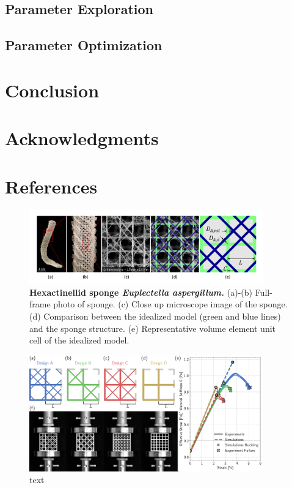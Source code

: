 \documentclass[9pt,twocolumn,twoside]{fernandes_paper}
\begin{document}
\subsection{Parameter Exploration}
\subsection{Parameter Optimization}

\section{Conclusion}

\section*{Acknowledgments}
\section*{References}

\begin{figure}[ht]
  \captionsetup{width=0.8\textwidth}
\begin{center}
\includegraphics[width=0.9\textwidth]{Fig1}
\end{center}
\caption{\textbf{Hexactinellid sponge \textit{Euplectella aspergillum.}} (a)-(b) Full-frame photo of sponge. (c) Close up microscope image of the sponge. (d) Comparison between the idealized model (green and blue lines) and the sponge structure. (e) Representative volume element unit cell of the idealized model.}\label{Fig1}
\end{figure}

\begin{figure}[ht]
	\centering
	\captionsetup{width=0.8\textwidth}
	\includegraphics[width=0.9\textwidth]{Fig2}
	\caption{text}\label{Fig2}
\end{figure}
\end{document}
